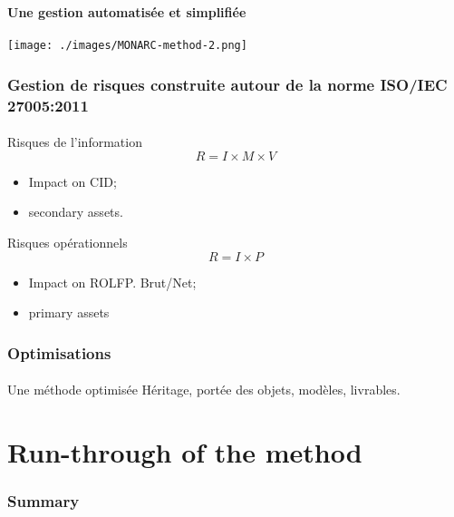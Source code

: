\documentclass[]{beamer}
\begin{document}
\begin{frame}
    \frametitle{}
    \framesubtitle{Une gestion automatisée et simplifiée}
    \begin{center}
        \texttt{[image: ./images/MONARC-method-2.png]}
    \end{center}
\end{frame}


\begin{frame}
    \frametitle{Gestion de risques construite autour de la norme ISO/IEC 27005:2011}
    \framesubtitle{}
    \begin{block}{Risques de l’information}
        $$R = I \times M \times V$$
        \begin{itemize}
            \item Impact on CID;
            \item secondary assets.
        \end{itemize}
    \end{block}


    \begin{block}{Risques opérationnels}
        $$R = I \times P$$
        \begin{itemize}
            \item Impact on ROLFP. Brut/Net;
            \item primary assets
        \end{itemize}
    \end{block}
\end{frame}


\begin{frame}
    \frametitle{Optimisations}
    \framesubtitle{}
    \begin{block}{Une méthode optimisée}
    Héritage, portée des objets, modèles, livrables.
    \end{block}
\end{frame}




%
%
\section{Run-through of the method}
\begin{frame}
    \frametitle{Summary}
    \begin{columns}[t]
        \begin{column}{5cm}
            \tableofcontents[sections={1-3}, currentsection, hideothersubsections]
        \end{column}
        \begin{column}{5cm}
            \tableofcontents[sections={4-5}, currentsection, hideothersubsections]
        \end{column}
    \end{columns}
\end{frame}
\end{document}

